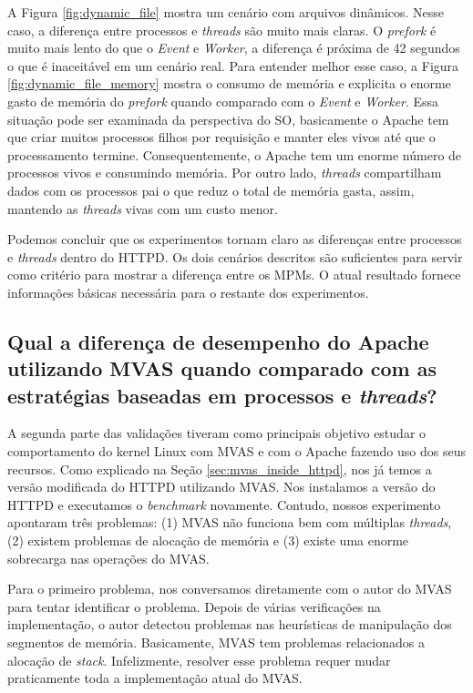 A Figura \ref{fig:dynamic_file} mostra um cenário com arquivos dinâmicos. Nesse
caso, a diferença entre processos e \emph{threads} são muito mais claras. O
\emph{prefork} é muito mais lento do que o \emph{Event} e \emph{Worker}, a
diferença é próxima de 42 segundos o que é inaceitável em um cenário real.
Para entender melhor esse caso, a Figura \ref{fig:dynamic_file_memory} mostra o
consumo de memória e explicita o enorme gasto de memória do \emph{prefork}
quando comparado com o \emph{Event} e \emph{Worker}. Essa situação pode ser
examinada da perspectiva do SO, basicamente o Apache tem que criar muitos
processos filhos por requisição e manter eles vivos até que o processamento
termine. Consequentemente, o Apache tem um enorme número de processos vivos e
consumindo memória. Por outro lado, \emph{threads} compartilham dados com os
processos pai o que reduz o total de memória gasta, assim, mantendo as
\emph{threads} vivas com um custo menor.

Podemos concluir que os experimentos tornam claro as diferenças entre processos
e \emph{threads} dentro do HTTPD. Os dois cenários descritos são suficientes
para servir como critério para mostrar a diferença entre os MPMs. O
atual resultado fornece informações básicas necessária para o restante dos
experimentos.

\subsection{Qual a diferença de desempenho do Apache utilizando MVAS quando comparado com as estratégias baseadas em processos e \emph{threads}?}

A segunda parte das validações tiveram como principais objetivo estudar o
comportamento do kernel Linux com MVAS e com o Apache fazendo uso dos seus
recursos. Como explicado na Seção \ref{sec:mvas_inside_httpd}, nos já temos a
versão modificada do HTTPD utilizando MVAS. Nos instalamos a versão do HTTPD e
executamos o \emph{benchmark} novamente. Contudo, nossos experimento apontaram
três problemas: (1) MVAS não funciona bem com múltiplas \emph{threads}, (2)
existem problemas de alocação de memória e (3) existe uma enorme sobrecarga nas
operações do MVAS.

Para o primeiro problema, nos conversamos diretamente com o autor do MVAS para
tentar identificar o problema. Depois de várias verificações na implementação,
o autor detectou problemas nas heurísticas de manipulação dos segmentos de
memória.  Basicamente, MVAS tem problemas relacionados a alocação de
\emph{stack}.  Infelizmente, resolver esse problema requer mudar praticamente
toda a implementação atual do MVAS.

